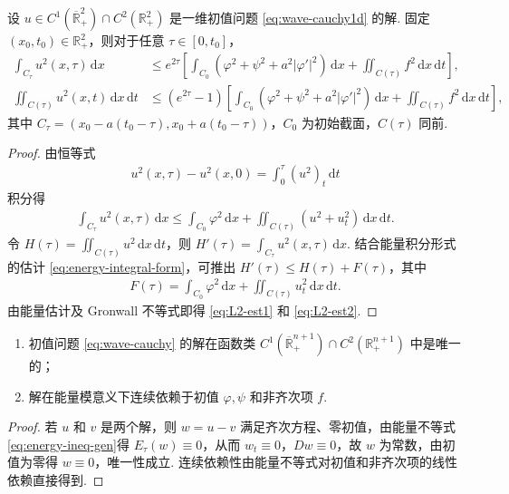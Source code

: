 \documentclass[../../main.tex]{subfiles}%
\begin{document}
\begin{corollary}
设 $u\in C^1(\overline{\mathbb{R}}^2_+)\cap C^2(\mathbb{R}^2_+)$ 是一维初值问题 \eqref{eq:wave-cauchy1d} 的解. 固定 $(x_0,t_0)\in\mathbb{R}^2_+$，则对于任意 $\tau\in[0,t_0]$，
\begin{align}
\int_{C_\tau} u^2(x,\tau)\,\mathrm{d}x
&\leqslant e^{2\tau}\left[\int_{C_0}(\varphi^2+\psi^2+a^2|\varphi'|^2)\,\mathrm{d}x+\iint_{C(\tau)}f^2\,\mathrm{d}x\,\mathrm{d}t\right], \label{eq:L2-est1} \\
\iint_{C(\tau)} u^2(x,t)\,\mathrm{d}x\,\mathrm{d}t
&\leqslant (e^{2\tau}-1)\left[\int_{C_0}(\varphi^2+\psi^2+a^2|\varphi'|^2)\,\mathrm{d}x+\iint_{C(\tau)}f^2\,\mathrm{d}x\,\mathrm{d}t\right], \label{eq:L2-est2}
\end{align}
其中 $C_\tau=(x_0-a(t_0-\tau),x_0+a(t_0-\tau))$，$C_0$ 为初始截面，$C(\tau)$ 同前.
\end{corollary}
\begin{proof}
由恒等式
\begin{align*}
u^2(x,\tau)-u^2(x,0)=\int_0^\tau (u^2)_t\,\mathrm{d}t
\end{align*}
积分得
\begin{align*}
\int_{C_\tau}u^2(x,\tau)\,\mathrm{d}x \leqslant \int_{C_0}\varphi^2\,\mathrm{d}x+\iint_{C(\tau)}(u^2+u_t^2)\,\mathrm{d}x\,\mathrm{d}t.
\end{align*}
令 $H(\tau)=\iint_{C(\tau)}u^2\,\mathrm{d}x\,\mathrm{d}t$，则 $H'(\tau)=\int_{C_\tau}u^2(x,\tau)\,\mathrm{d}x$. 结合能量积分形式的估计 \eqref{eq:energy-integral-form}，可推出 $H'(\tau)\leqslant H(\tau)+F(\tau)$，其中
\begin{align*}
F(\tau)=\int_{C_0}\varphi^2\,\mathrm{d}x+\iint_{C(\tau)}u_t^2\,\mathrm{d}x\,\mathrm{d}t.
\end{align*}
由能量估计及 Gronwall 不等式即得 \eqref{eq:L2-est1} 和 \eqref{eq:L2-est2}.
\end{proof}

\begin{corollary}[$n$维波动方程Cauchy初值问题解的适定性]\label{corollary:$n$维波动方程Cauchy初值问题解的适定性}
\begin{enumerate}[(1)]
\item 初值问题 \eqref{eq:wave-cauchy} 的解在函数类 $C^1(\overline{\mathbb{R}}^{n+1}_+)\cap C^2(\mathbb{R}^{n+1}_+)$ 中是唯一的；
\item 解在能量模意义下连续依赖于初值 $\varphi,\psi$ 和非齐次项 $f$.
\end{enumerate}
\end{corollary}
\begin{proof}
若 $u$ 和 $v$ 是两个解，则 $w=u-v$ 满足齐次方程、零初值，由能量不等式\eqref{eq:energy-ineq-gen}得 $E_\tau(w)\equiv 0$，从而 $w_t\equiv 0$，$Dw\equiv 0$，故 $w$ 为常数，由初值为零得 $w\equiv 0$，唯一性成立. 连续依赖性由能量不等式对初值和非齐次项的线性依赖直接得到.
\end{proof}
\end{document}
